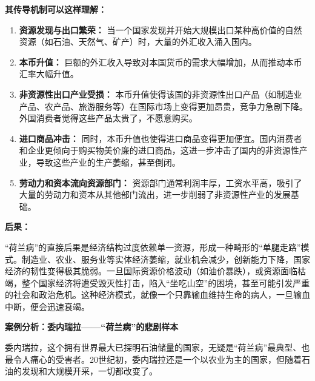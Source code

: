 \textbf{其传导机制可以这样理解：}

\begin{enumerate}
    \item \textbf{资源发现与出口繁荣：} 当一个国家发现并开始大规模出口某种高价值的自然资源（如石油、天然气、矿产）时，大量的外汇收入涌入国内。
    \item \textbf{本币升值：} 巨额的外汇收入导致对本国货币的需求大幅增加，从而推动本币汇率大幅升值。
    \item \textbf{非资源性出口产业受损：} 本币升值使得该国的非资源性出口产品（如制造业产品、农产品、旅游服务等）在国际市场上变得更加昂贵，竞争力急剧下降。外国消费者觉得这些产品太贵了，不愿意购买。
    \item \textbf{进口商品冲击：} 同时，本币升值也使得进口商品变得更加便宜。国内消费者和企业更倾向于购买物美价廉的进口商品，这进一步冲击了国内的非资源性产业，导致这些产业的生产萎缩，甚至倒闭。
    \item \textbf{劳动力和资本流向资源部门：} 资源部门通常利润丰厚，工资水平高，吸引了大量的劳动力和资本从其他部门流出，进一步削弱了非资源性产业的发展基础。
\end{enumerate}

\textbf{后果：}

“荷兰病”的直接后果是经济结构过度依赖单一资源，形成一种畸形的“单腿走路”模式。制造业、农业、服务业等实体经济萎缩，就业机会减少，创新能力下降，国家经济的韧性变得极其脆弱。一旦国际资源价格波动（如油价暴跌），或资源面临枯竭，整个国家经济将遭受毁灭性打击，陷入“坐吃山空”的困境，甚至可能引发严重的社会和政治危机。这种经济模式，就像一个只靠输血维持生命的病人，一旦输血中断，便会迅速衰竭。

\textbf{案例分析：委内瑞拉——“荷兰病”的悲剧样本}

委内瑞拉，这个拥有世界最大已探明石油储量的国家，无疑是“荷兰病”最典型、也最令人痛心的受害者。20世纪初，委内瑞拉还是一个以农业为主的国家，但随着石油的发现和大规模开采，一切都改变了。


